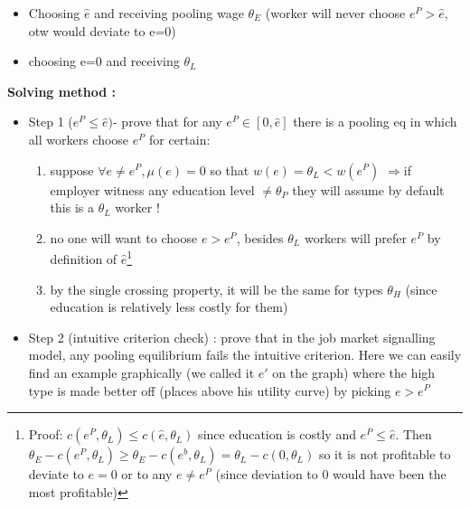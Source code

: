 \documentclass{article}
\begin{document}
 \begin{itemize}
     \item Choosing $\hat{e}$ and receiving pooling wage $\theta_E$ (worker will never choose $e^P>\hat{e}$, otw would deviate to e=0) 
     \item choosing e=0 and receiving $\theta_L$
 \end{itemize}
 \textbf{Solving method : }
\begin{itemize}
    \item Step 1 ($e^P\leq\hat{e})$- prove that for any $e^P\in[0,\hat{e}]$ there is a pooling eq in which all workers choose $e^P$ for certain: 
    \begin{enumerate}
        \item suppose $\forall e\neq e^P,\mu(e)=0$ so that $w(e)=\theta_L<w(e^P)$ $\Rightarrow $if employer witness any education level $\neq \theta_P$ they will assume by default this is a $\theta_L$ worker !
        \item no one will want to choose $e>e^P$, besides $\theta_L$ workers will prefer $e^P$ by definition of $\hat{e}$\footnote{Proof: $c(e^P,\theta_L) \leq c(\hat{e},\theta_L)$ since education is costly and $e^P\leq\hat{e}$. Then $\theta_E - c(e^P,\theta_L) \geq \theta_E - c(e^b,\theta_L) = \theta_L - c(0,\theta_L)$ so it is not profitable to deviate to $e=0$ or to any $e\neq e^P$ (since deviation to 0 would have been the most profitable)}
        \item by the single crossing property, it will be the same for types $\theta_H$ (since education is relatively less costly for them)
    \end{enumerate}
    \item Step 2 (intuitive criterion check) : prove that in the job market signalling model, any pooling equilibrium fails the intuitive criterion. Here we can easily find an example graphically (we called it $e'$ on the graph) where the high type is made better off (places above his utility curve) by picking $e > e^P$
\end{itemize}
\end{document}
